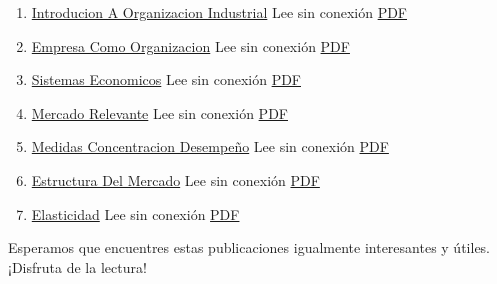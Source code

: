 \documentclass[
  doc,
  floatsintext,
  longtable,
  a4paper,
  nolmodern,
  notxfonts,
  notimes,
  colorlinks=true,linkcolor=blue,citecolor=blue,urlcolor=blue]{apa7}
\providecommand{\tightlist}{%
  \setlength{\itemsep}{0pt}\setlength{\parskip}{0pt}}
\begin{document}
\begin{enumerate}
\def\labelenumi{\arabic{enumi}.}
\tightlist
\item
  \href{https://achalmaedison.netlify.app/microeconomia/organizacion-industrial/2023-06-12-introducion-a-organizacion-industrial}{Introducion
  A Organizacion Industrial} Lee sin conexión
  \href{https://achalmaedison.netlify.app/microeconomia/organizacion-industrial/2023-06-12-introducion-a-organizacion-industrial/index.pdf}{PDF}
\item
  \href{https://achalmaedison.netlify.app/microeconomia/organizacion-industrial/2023-06-13-empresa-como-organizacion}{Empresa
  Como Organizacion} Lee sin conexión
  \href{https://achalmaedison.netlify.app/microeconomia/organizacion-industrial/2023-06-13-empresa-como-organizacion/index.pdf}{PDF}
\item
  \href{https://achalmaedison.netlify.app/microeconomia/organizacion-industrial/2023-06-13-sistemas-economicos}{Sistemas
  Economicos} Lee sin conexión
  \href{https://achalmaedison.netlify.app/microeconomia/organizacion-industrial/2023-06-13-sistemas-economicos/index.pdf}{PDF}
\item
  \href{https://achalmaedison.netlify.app/microeconomia/organizacion-industrial/2023-06-15-mercado-relevante}{Mercado
  Relevante} Lee sin conexión
  \href{https://achalmaedison.netlify.app/microeconomia/organizacion-industrial/2023-06-15-mercado-relevante/index.pdf}{PDF}
\item
  \href{https://achalmaedison.netlify.app/microeconomia/organizacion-industrial/2023-06-16-medidas-concentracion-desempeño}{Medidas
  Concentracion Desempeño} Lee sin conexión
  \href{https://achalmaedison.netlify.app/microeconomia/organizacion-industrial/2023-06-16-medidas-concentracion-desempeño/index.pdf}{PDF}
\item
  \href{https://achalmaedison.netlify.app/microeconomia/organizacion-industrial/2023-06-17-estructura-del-mercado}{Estructura
  Del Mercado} Lee sin conexión
  \href{https://achalmaedison.netlify.app/microeconomia/organizacion-industrial/2023-06-17-estructura-del-mercado/index.pdf}{PDF}
\item
  \href{https://achalmaedison.netlify.app/microeconomia/organizacion-industrial/2023-06-23-elasticidad}{Elasticidad}
  Lee sin conexión
  \href{https://achalmaedison.netlify.app/microeconomia/organizacion-industrial/2023-06-23-elasticidad/index.pdf}{PDF}
\end{enumerate}

Esperamos que encuentres estas publicaciones igualmente interesantes y
útiles. ¡Disfruta de la lectura!
\end{document}
